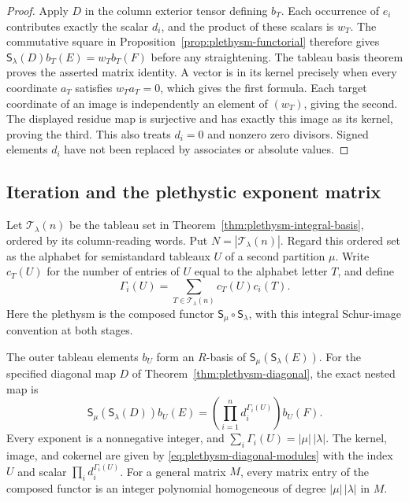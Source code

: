 \begin{proof}
Apply $D$ in the column exterior tensor defining $b_T$.
Each occurrence of $e_i$ contributes exactly the scalar $d_i$,
and the product of these scalars is $w_T$. The commutative
square in Proposition~\ref{prop:plethysm-functorial} therefore
gives $\mathsf S_\lambda(D)b_T(E)=w_Tb_T(F)$ before any
straightening. The tableau basis theorem proves the asserted
matrix identity. A vector is in its kernel precisely when every
coordinate $a_T$ satisfies $w_Ta_T=0$, which gives the first
formula. Each target coordinate of an image is independently an
element of $(w_T)$, giving the second. The displayed residue map
is surjective and has exactly this image as its kernel, proving
the third. This also treats $d_i=0$ and nonzero zero divisors.
Signed elements $d_i$ have not been replaced by associates or
absolute values.
\end{proof}

\subsection{Iteration and the plethystic exponent matrix}

Let $\mathcal T_\lambda(n)$ be the tableau set in
Theorem~\ref{thm:plethysm-integral-basis}, ordered by its
column-reading words. Put $N=|\mathcal T_\lambda(n)|$.
Regard this ordered set as the alphabet for semistandard tableaux
$U$ of a second partition $\mu$. Write $c_T(U)$ for the number
of entries of $U$ equal to the alphabet letter $T$, and define
\begin{equation}
 \Gamma_i(U)=\sum_{T\in\mathcal T_\lambda(n)}c_T(U)c_i(T).
 \label{eq:plethysm-nested-exponents}
\end{equation}
Here the plethysm is the composed functor
$\mathsf S_\mu\circ\mathsf S_\lambda$, with this integral
Schur-image convention at both stages.

\begin{corollary}
\label{cor:plethysm-nested-diagonal}
The outer tableau elements $b_U$ form an $R$-basis of
$\mathsf S_\mu(\mathsf S_\lambda(E))$.
For the specified diagonal map $D$ of
Theorem~\ref{thm:plethysm-diagonal}, the exact nested map is
\begin{equation}
 \mathsf S_\mu(\mathsf S_\lambda(D))b_U(E)
   =\left(\prod_{i=1}^n d_i^{\Gamma_i(U)}\right)b_U(F).
 \label{eq:plethysm-nested-diagonal}
\end{equation}
Every exponent is a nonnegative integer, and
$\sum_i\Gamma_i(U)=|\mu|\,|\lambda|$.
The kernel, image, and cokernel are given by
\eqref{eq:plethysm-diagonal-modules} with the index $U$ and
scalar $\prod_i d_i^{\Gamma_i(U)}$.
For a general matrix $M$, every matrix entry of the composed
functor is an integer polynomial homogeneous of degree
$|\mu|\,|\lambda|$ in $M$.
\end{corollary}


